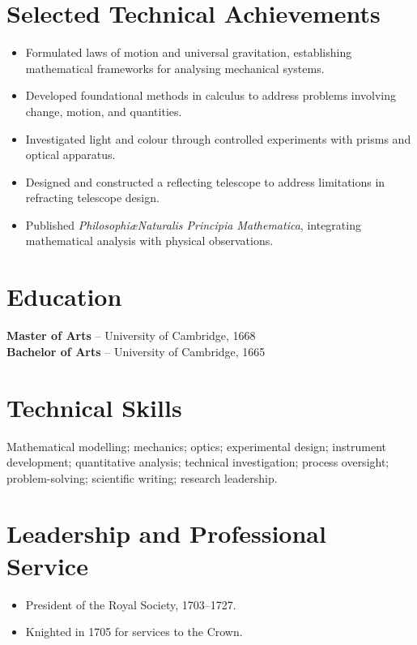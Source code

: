 \documentclass[11pt,a4paper]{article}
\begin{document}
\section*{Selected Technical Achievements}
\begin{itemize}
\item Formulated laws of motion and universal gravitation, establishing mathematical frameworks for analysing mechanical systems.
\item Developed foundational methods in calculus to address problems involving change, motion, and quantities.
\item Investigated light and colour through controlled experiments with prisms and optical apparatus.
\item Designed and constructed a reflecting telescope to address limitations in refracting telescope design.
\item Published \textit{Philosophi\ae Naturalis Principia Mathematica}, integrating mathematical analysis with physical observations.
\end{itemize}
\section*{Education}
\textbf{Master of Arts} -- University of Cambridge, 1668\\
\textbf{Bachelor of Arts} -- University of Cambridge, 1665
\section*{Technical Skills}
Mathematical modelling; mechanics; optics; experimental design; instrument development; quantitative analysis; technical investigation; process oversight; problem-solving; scientific writing; research leadership.
\section*{Leadership and Professional Service}
\begin{itemize}
\item President of the Royal Society, 1703--1727.
\item Knighted in 1705 for services to the Crown.
\end{itemize}
\end{document}
